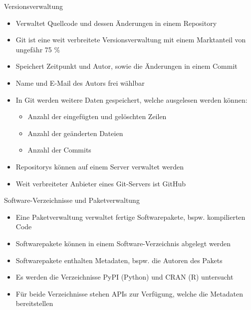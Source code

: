 \documentclass[%
    handout,
    aspectratio=1610,
    10pt,
    onlytextwidth, %
]{beamer}
\begin{document}
\begin{frame}{Versionsverwaltung}
    \begin{itemize}
        \item Verwaltet Quellcode und dessen Änderungen in einem Repository
        \item Git ist eine weit verbreitete Versionsverwaltung mit einem Marktanteil von ungefähr 75 \% \autocite{lindner_version_2024}
        \item Speichert Zeitpunkt und Autor, sowie die Änderungen in einem Commit
        \item Name und E-Mail des Autors frei wählbar
        \item In Git werden weitere Daten gespeichert, welche ausgelesen werden können:
        \begin{itemize}
            \item Anzahl der eingefügten und gelöschten Zeilen
            \item Anzahl der geänderten Dateien
            \item Anzahl der Commits
        \end{itemize}
        \item Repositorys können auf einem Server verwaltet werden
        \item Weit verbreiteter Anbieter eines Git-Servers ist GitHub
    \end{itemize}
\end{frame}

\begin{frame}{Software-Verzeichnisse und Paketverwaltung}
    \begin{itemize}
        \item Eine Paketverwaltung verwaltet fertige Softwarepakete, bspw. kompilierten Code
        \item Softwarepakete können in einem Software-Verzeichnis abgelegt werden
        \item Softwarepakete enthalten Metadaten, bspw. die Autoren des Pakets
        \item Es werden die Verzeichnisse PyPI (Python) und CRAN (R) untersucht
        \item Für beide Verzeichnisse stehen APIs zur Verfügung, welche die Metadaten bereitstellen
    \end{itemize}
\end{frame}
\end{document}
